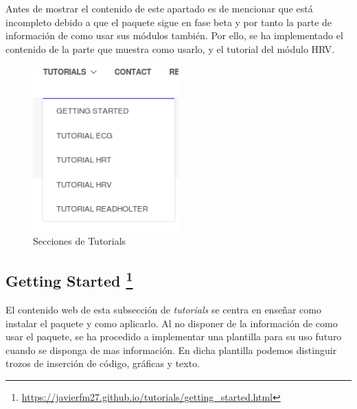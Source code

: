 Antes de mostrar el contenido de este apartado es de mencionar que está incompleto debido a que el paquete sigue en fase beta y por tanto la parte de información de como usar sus módulos también. Por ello, se ha implementado el contenido de la parte que muestra como usarlo, y el tutorial del módulo HRV. 

\begin{figure}[H]
    \centering
    \includegraphics[width=0.5\textwidth]{img/tutorials_panel.png}
    \caption{Secciones de Tutorials }
    \label{fig:tutoWebPanel}
\end{figure}





\subsection[Getting Started]{Getting Started \footnote{\url{https://javierfm27.github.io/tutorials/getting_started.html}}}
El contenido web de esta subsección de \textit{tutorials} se centra en enseñar como instalar el paquete y como aplicarlo. Al no disponer de la información de como usar el paquete, se ha procedido a implementar una plantilla para su uso futuro cuando se disponga de mas información. En dicha plantilla podemos distinguir trozos de inserción de código, gráficas y texto. 

